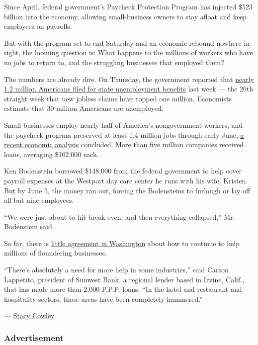 Since April, federal government's Paycheck Protection Program has
injected \$523 billion into the economy, allowing small-business owners
to stay afloat and keep employees on payrolls.

But with the program set to end Saturday and an economic rebound nowhere
in sight, the looming question is: What happens to the millions of
workers who have no jobs to return to, and the struggling businesses
that employed them?

The numbers are already dire. On Thursday, the government reported that
\href{https://www.nytimes3xbfgragh.onion/live/2020/08/06/business/stock-market-today-coronavirus/new-state-jobless-claims-decline-but-exceed-one-million-for-the-20th-week}{nearly
1.2 million Americans filed for state unemployment benefits} last week
--- the 20th straight week that new jobless claims have topped one
million. Economists estimate that 30 million Americans are unemployed.

Small businesses employ nearly half of America's nongovernment workers,
and the paycheck program preserved at least 1.4 million jobs through
early June, \href{http://economics.mit.edu/files/20094}{a recent
economic analysis} concluded. More than five million companies received
loans, averaging \$102,000 each.

Ken Bodenstein borrowed \$148,000 from the federal government to help
cover payroll expenses at the Westport day care center he runs with his
wife, Kristen. But by June 5, the money ran out, forcing the Bodensteins
to furlough or lay off all but nine employees.

``We were just about to hit break-even, and then everything collapsed,''
Mr. Bodenstein said.

So far, there is
\href{https://www.nytimes3xbfgragh.onion/2020/08/05/us/politics/congress-coronavirus-stimulus.html}{little
agreement in Washington} about how to continue to help millions of
floundering businesses.

``There's absolutely a need for more help in some industries,'' said
Carson Lappetito, president of Sunwest Bank, a regional lender based in
Irvine, Calif., that has made more than 2,000 P.P.P. loans. ``In the
hotel and restaurant and hospitality sectors, those areas have been
completely hammered.''

--- \href{https://www.nytimes3xbfgragh.onion/by/stacy-cowley}{Stacy
Cowley}

\hypertarget{advertisement}{%
\subsubsection{Advertisement}\label{advertisement}}

